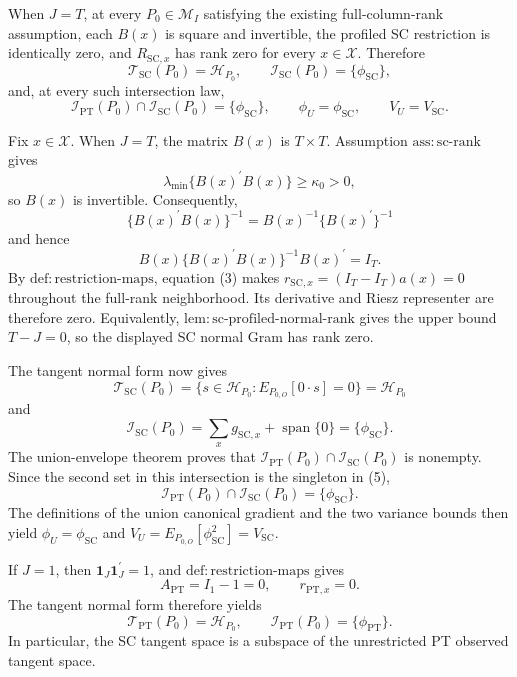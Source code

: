 When \(J=T\), at every \(P_0\in\mathcal M_I\) satisfying the existing full-column-rank assumption, each \(B(x)\) is square and invertible, the profiled SC restriction is identically zero, and \(R_{\mathrm{SC},x}\) has rank zero for every \(x\in\mathcal X\). Therefore
\[
 \mathcal T_{\mathrm{SC}}(P_0)=\mathcal H_{P_0},
 \qquad
 \mathcal I_{\mathrm{SC}}(P_0)=\{\phi_{\mathrm{SC}}\},
\]
and, at every such intersection law,
\[
 \mathcal I_{\mathrm{PT}}(P_0)\cap\mathcal I_{\mathrm{SC}}(P_0)
 =\{\phi_{\mathrm{SC}}\},
 \qquad
 \phi_U=\phi_{\mathrm{SC}},
 \qquad
 V_U=V_{\mathrm{SC}}.
\]

Fix \(x\in\mathcal X\). When \(J=T\), the matrix \(B(x)\) is \(T\times T\). Assumption \(\mathrm{ass{:}sc\text{-}rank}\) gives
\[
 \lambda_{\min}\{B(x)^{\prime}B(x)\}\ge\kappa_0>0,
 \tag{1}
\]
so \(B(x)\) is invertible. Consequently,
\[
 \{B(x)^{\prime}B(x)\}^{-1}
 =B(x)^{-1}\{B(x)^{\prime}\}^{-1}
 \tag{2}
\]
and hence
\[
 B(x)\{B(x)^{\prime}B(x)\}^{-1}B(x)^{\prime}=I_T.
 \tag{3}
\]
By \(\mathrm{def{:}restriction\text{-}maps}\), equation (3) makes \(r_{\mathrm{SC},x}=(I_T-I_T)a(x)=0\) throughout the full-rank neighborhood. Its derivative and Riesz representer are therefore zero. Equivalently, \(\mathrm{lem{:}sc\text{-}profiled\text{-}normal\text{-}rank}\) gives the upper bound \(T-J=0\), so the displayed SC normal Gram has rank zero.

The tangent normal form now gives
\[
 \mathcal T_{\mathrm{SC}}(P_0)
 =\{s\in\mathcal H_{P_0}:E_{P_{0,O}}[0\cdot s]=0\}
 =\mathcal H_{P_0}
 \tag{4}
\]
and
\[
 \mathcal I_{\mathrm{SC}}(P_0)
 =\sum_xg_{\mathrm{SC},x}+\operatorname{span}\{0\}
 =\{\phi_{\mathrm{SC}}\}.
 \tag{5}
\]
The union-envelope theorem proves that \(\mathcal I_{\mathrm{PT}}(P_0)\cap\mathcal I_{\mathrm{SC}}(P_0)\) is nonempty. Since the second set in this intersection is the singleton in (5),
\[
 \mathcal I_{\mathrm{PT}}(P_0)\cap\mathcal I_{\mathrm{SC}}(P_0)
 =\{\phi_{\mathrm{SC}}\}.
 \tag{6}
\]
The definitions of the union canonical gradient and the two variance bounds then yield \(\phi_U=\phi_{\mathrm{SC}}\) and \(V_U=E_{P_{0,O}}[\phi_{\mathrm{SC}}^2]=V_{\mathrm{SC}}\).

If \(J=1\), then \(\mathbf 1_J\mathbf 1_J^{\prime}=1\), and \(\mathrm{def{:}restriction\text{-}maps}\) gives
\[
 A_{\mathrm{PT}}=I_1-1=0,
 \qquad
 r_{\mathrm{PT},x}=0.
 \tag{1}
\]
The tangent normal form therefore yields
\[
 \mathcal T_{\mathrm{PT}}(P_0)=\mathcal H_{P_0},
 \qquad
 \mathcal I_{\mathrm{PT}}(P_0)=\{\phi_{\mathrm{PT}}\}.
 \tag{2}
\]
In particular, the SC tangent space is a subspace of the unrestricted PT observed tangent space.

